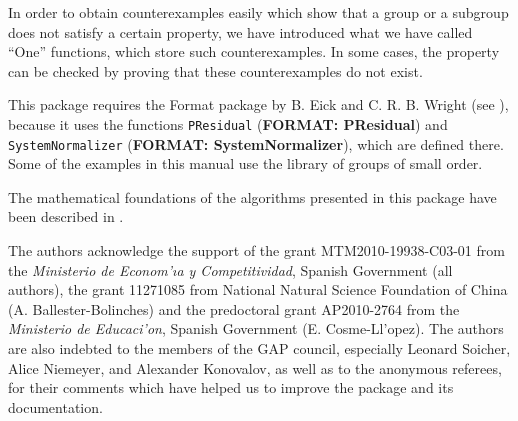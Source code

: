 \documentclass[a4paper,11pt]{report}
\begin{document}
{ In order to obtain counterexamples easily which show that a group or a
subgroup does not satisfy a certain property, we have introduced what we have
called ``One'' functions, which store such counterexamples. In some cases, the property can
be checked by proving that these counterexamples do not exist. 

 This package requires the \textsf{Format} package by B. Eick and C. R. B. Wright (see \cite{EickWright03-FORMAT}), because it uses the functions \texttt{PResidual} (\textbf{FORMAT: PResidual}) and \texttt{SystemNormalizer} (\textbf{FORMAT: SystemNormalizer}), which are defined there. Some of the examples in this manual use the library
of groups of small order. 

 The mathematical foundations of the algorithms presented in this package have
been described in \cite{BallesterCosmeEsteban13-cejm}. 

 The authors acknowledge the support of the grant MTM2010-19938-C03-01 from the \emph{Ministerio de Econom{\a'\i}a y Competitividad}, Spanish Government (all authors), the grant 11271085 from National Natural
Science Foundation of China (A. Ballester-Bolinches) and the predoctoral grant
AP2010-2764 from the \emph{Ministerio de Educaci{\a'o}n}, Spanish Government (E. Cosme-Ll{\a'o}pez). The authors are also indebted to
the members of the \textsf{GAP} council, especially Leonard Soicher, Alice Niemeyer, and Alexander Konovalov,
as well as to the anonymous referees, for their comments which have helped us
to improve the package and its documentation. 

 }

 
\end{document}
